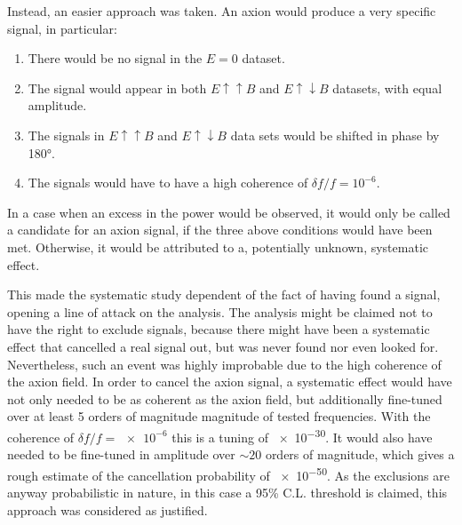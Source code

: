 Instead, an easier approach was taken. An axion would produce a very specific signal, in particular:
\begin{enumerate}
  \item There would be no signal in the $E=0$ dataset.
  \item The signal would appear in both $E \uparrow \uparrow B$ and $E \uparrow \downarrow B$ datasets, with equal amplitude.
  \item The signals in $E \uparrow \uparrow B$ and $E \uparrow \downarrow B$ data sets would be shifted in phase by \ang{180}.
  \item The signals would have to have a high coherence of $\delta f / f = 10^{-6}$.
\end{enumerate}
In a case when an excess in the power would be observed, it would only be called a candidate for an axion signal, if the three above conditions would have been met. Otherwise, it would be attributed to a, potentially unknown, systematic effect.

This made the systematic study dependent of the fact of having found a signal, opening a line of attack on the analysis. The analysis might be claimed not to have the right to exclude signals, because there might have been a systematic effect that cancelled a real signal out, but was never found nor even looked for. Nevertheless, such an event was highly improbable due to the high coherence of the axion field. In order to cancel the axion signal, a systematic effect would have not only needed to be as coherent as the axion field, but additionally fine-tuned over at least 5 orders of magnitude magnitude of tested frequencies. With the coherence of $\delta f / f = \num{e-6}$ this is a tuning of \num{e-30}. It would also have needed to be fine-tuned in amplitude over $\sim 20$ orders of magnitude, which gives a rough estimate of the cancellation probability of \num{e-50}. As the exclusions are anyway probabilistic in nature, in this case a 95\% C.L. threshold is claimed, this approach was considered as justified.




